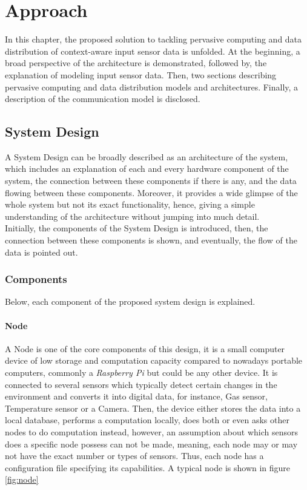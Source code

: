 
\chapter{Approach}\label{chapter:Approach}
In this chapter, the proposed solution to tackling pervasive computing and data distribution of context-aware input sensor data is unfolded. At the beginning, a broad perspective of the architecture is demonstrated, followed by, the explanation of modeling input sensor data. Then, two sections describing pervasive computing and data distribution models and architectures. Finally, a description of the communication model is disclosed.
\section{System Design }
A System Design can be broadly described as an architecture of the system, which includes an explanation of each and every hardware component of the system, the connection between these components if there is any, and the data flowing between these components. Moreover, it provides a wide glimpse of the whole system but not its exact functionality, hence, giving a simple understanding of the architecture without jumping into much detail.\\
Initially, the components of the System Design is introduced, then, the connection between these components is shown, and eventually, the flow of the data is pointed out.

\subsection{Components}
\label{sub:components}
Below, each component of the proposed system design is explained.

\subsubsection{Node}
\label{subsub:node}
A Node is one of the core components of this design, it is a small computer device of low storage and computation capacity compared to nowadays portable computers, commonly a \textit{Raspberry Pi} but could be any other device. It is connected to several sensors which typically detect certain changes in the environment and converts it into digital data, for instance, Gas sensor, Temperature sensor or a Camera. Then, the device either stores the data into a local database, performs a computation locally, does both or even asks other nodes to do computation instead, however, an assumption about which sensors does a specific node  possess can not be made, meaning, each node may or may not have the exact number or types of sensors. Thus, each node has a configuration file specifying its capabilities. A typical node is shown in figure \ref{fig:node}

